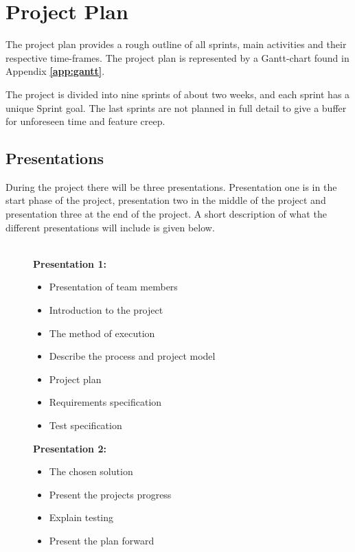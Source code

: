 \chapter{Project Plan}

The project plan provides a rough outline of all sprints, main activities and their respective time-frames. The project plan is represented by a Gantt-chart found in Appendix \textbf{\ref{app:gantt}}. 

The project is divided into nine sprints of about two weeks, and each sprint has a unique Sprint goal. The last sprints are not planned in full detail to give a buffer for unforeseen time and feature creep.

\section{Presentations}
During the project there will be three presentations. Presentation one is in the start phase of the project, presentation two in the middle of the project and presentation three at the end of the project. A short description of what the different presentations will include is given below. \\\\
\begin{figure}[h]
\begin{minipage}[t]{0.5\textwidth}
\textbf{Presentation 1:}
\begin{itemize}
  \item Presentation of team members
  \item Introduction to the project
  \item The method of execution
  \item Describe the process and project model 
  \item Project plan
  \item Requirements specification
  \item Test specification 
\end{itemize}
\end{minipage}
\hfill
\begin{minipage}[t]{0.5\textwidth}
\textbf{Presentation 2:}
\begin{itemize}
  \item The chosen solution
  \item Present the projects progress
  \item Explain testing
  \item Present the plan forward
\end{itemize}
\end{minipage}
\hfill
\end{figure}\\
